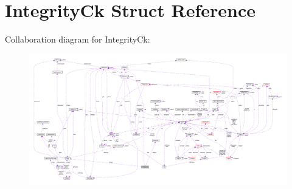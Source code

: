 \hypertarget{structIntegrityCk}{}\section{Integrity\+Ck Struct Reference}
\label{structIntegrityCk}


Collaboration diagram for Integrity\+Ck\+:\nopagebreak
\begin{figure}[H]
\begin{center}
\leavevmode
\includegraphics[width=350pt]{structIntegrityCk__coll__graph}
\end{center}
\end{figure}
